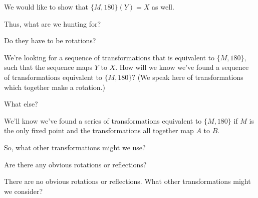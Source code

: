 
We would like to show that $\{M,180\} (Y) = X$ as well.

Thus, what are we hunting for?


Do they have to be rotations?



We're looking for a sequence of transformations that is equivalent to $\{M,180\},$ such that the sequence maps $Y$ to $X.$  How will we know we've found a sequence of transformations equivalent to $\{M,180\}?$  (We speak here of transformations which together make a rotation.)


What else?




We'll know we've found a series of transformations equivalent to $\{M,180\}$ if $M$ is the only fixed point and the transformations all together map $A$ to $B.$

So, what other transformations might we use?

Are there any obvious rotations or reflections?


There are no obvious rotations or reflections.  What other transformations might we consider?

